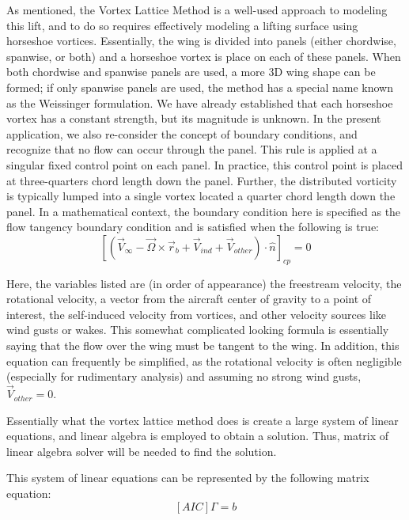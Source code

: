 \documentclass{article}
\begin{document}
\begin{itemize}
As mentioned, the Vortex Lattice Method is a well-used approach to modeling this lift, and to do so requires effectively modeling a lifting surface using horseshoe vortices.
Essentially, the wing is divided into panels (either chordwise, spanwise, or both) and a horseshoe vortex is place on each of these panels. When both chordwise and spanwise panels are used, a more 3D wing shape can be formed; if only spanwise panels are used, the method has a special name known as the Weissinger formulation.
We have already established that each horseshoe vortex has a constant strength, but its magnitude is unknown. In the present application, we also re-consider the concept of boundary conditions, and recognize that no flow can occur through the panel. This rule is applied at a singular fixed control point on each panel.
In practice, this control point is placed at three-quarters chord length down the panel. Further, the distributed vorticity is typically lumped into a single vortex located a quarter chord length down the panel. 
In a mathematical context, the boundary condition here is specified as the flow tangency boundary condition and is satisfied when the following is true:
\begin{equation}\label{boundary_condition}
{\left[\left(\vec{V}_{\infty} - \vec{\Omega} \times \vec{r}_b + \vec{V}_{ind} + \vec{V}_{other}\right) \cdot \hat{n}\right]}_{cp} = 0 
\end{equation}

Here, the variables listed are (in order of appearance) the freestream velocity, the rotational velocity, a vector from the aircraft center of gravity to a point of interest, the self-induced velocity from vortices, and other velocity sources like wind gusts or wakes. This somewhat complicated looking formula is essentially saying that the flow over the wing must be tangent to the wing.
In addition, this equation can frequently be simplified, as the rotational velocity is often negligible (especially for rudimentary analysis) and assuming no strong wind gusts, $\vec{V}_{other} = 0$. 

Essentially what the vortex lattice method does is create a large system of linear equations, and linear algebra is employed to obtain a solution. Thus, matrix of linear algebra solver will be needed to find the solution.

This system of linear equations can be represented by the following matrix equation:
\begin{equation}\label{eq:AIC_matrix}
\left[AIC\right]\Gamma = b
\end{equation}


\end{itemize}
\end{document}
